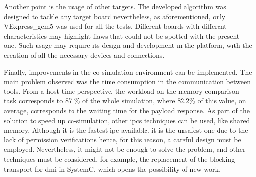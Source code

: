 Another point is the usage of other targets. The developed algorithm was designed to tackle any target board nevertheless, as 
aforementioned, only VExpress\_gem5 was used for all the tests. Different boards with different characteristics may highlight flaws
that could not be spotted with the present one. Such usage may require its design and development in the platform, 
with the creation of all the necessary devices and connections. 

Finally, improvements in the co-simulation environment can be implemented. The main problem observed was the time consumption in the 
communication between tools. From a host time perspective, the workload on the memory comparison task corresponds to 87 \% of the 
whole simulation, where 82.2\% of this value, on average, corresponds to the waiting time for the payload response. As part of the solution
to speed up co-simulation, other \glspl*{ipc} techniques can be used, like shared memory. Although it is the 
fastest \gls{ipc} available, it is the unsafest one due to the lack of permission verifications hence, for this reason, a careful 
design must be employed. Nevertheless, it might not be enough to solve the problem, and other techniques must be considered, for example, 
the replacement of the blocking transport for \gls{dmi} in SystemC, which opens the possibility of new work. 

